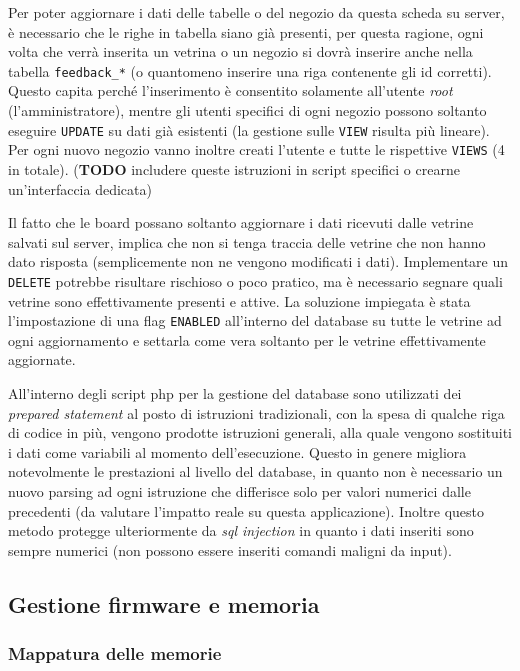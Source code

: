 Per poter aggiornare i dati delle tabelle o del negozio da questa scheda su server, \`e necessario che le righe in tabella siano gi\`a presenti, per questa ragione, ogni volta che verr\`a inserita un vetrina o un negozio si dovr\`a inserire anche nella tabella \texttt{feedback\_*} (o quantomeno inserire una riga contenente gli id corretti). Questo capita perch\'e l'inserimento \`e consentito solamente all'utente \textit{root} (l'amministratore), mentre gli utenti specifici di ogni negozio possono soltanto eseguire \texttt{UPDATE} su dati gi\`a esistenti (la gestione sulle \texttt{VIEW} risulta pi\`u lineare). Per ogni nuovo negozio vanno inoltre creati l'utente e tutte le rispettive \texttt{VIEWS} (4 in totale). (\textbf{TODO} includere queste istruzioni in script specifici o crearne un'interfaccia dedicata)

Il fatto che le board possano soltanto aggiornare i dati ricevuti dalle vetrine salvati sul server, implica che non si tenga traccia delle vetrine che non hanno dato risposta (semplicemente non ne vengono modificati i dati). Implementare un \texttt{DELETE} potrebbe risultare rischioso o poco pratico, ma \`e necessario segnare quali vetrine sono effettivamente presenti e attive. La soluzione impiegata \`e stata l'impostazione di una flag \texttt{ENABLED} all'interno del database su tutte le vetrine ad ogni aggiornamento e settarla come vera soltanto per le vetrine effettivamente aggiornate.

All'interno degli script php per la gestione del database sono utilizzati dei \textit{prepared statement} al posto di istruzioni tradizionali, con la spesa di qualche riga di codice in pi\`u, vengono prodotte istruzioni generali, alla quale vengono sostituiti i dati come variabili al momento dell'esecuzione. Questo in genere migliora notevolmente le prestazioni al livello del database, in quanto non \`e necessario un nuovo parsing ad ogni istruzione che differisce solo per valori numerici dalle precedenti (da valutare l'impatto reale su questa applicazione). Inoltre questo metodo protegge ulteriormente da \textit{sql injection} in quanto i dati inseriti sono sempre numerici (non possono essere inseriti comandi maligni da input).

\subsection{Gestione firmware e memoria}

\subsubsection{Mappatura delle memorie}

